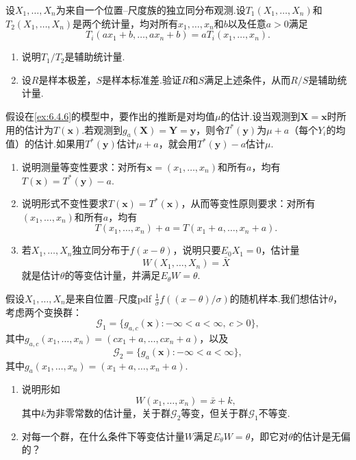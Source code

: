 \begin{exercise}\label{exercise:6.40}
设$X_1,\ldots,X_n$为来自一个位置--尺度族的独立同分布观测.设$T_1(X_1,\ldots,X_n)$和$T_2(X_1,\ldots,X_n)$是两个统计量，均对所有$x_1,\ldots,x_n$和$b$以及任意$a>0$满足
$$T_i(ax_1+b,\ldots,ax_n+b)=aT_i(x_1,\ldots,x_n).$$
\begin{enumerate}[label=(\alph*)]
\item 说明$T_1/T_2$是辅助统计量.
\item 设$R$是样本极差，$S$是样本标准差.验证$R$和$S$满足上述条件，从而$R/S$是辅助统计量.
\end{enumerate}
\end{exercise}
\begin{exercise}\label{exercise:6.41}
假设在\autoref{ex:6.4.6}的模型中，要作出的推断是对均值$\mu$的估计.设当观测到$\boldsymbol X=\boldsymbol x$时所用的估计为$T(\boldsymbol x)$.若观测到$g_a(\boldsymbol X)=\boldsymbol Y=\boldsymbol y$，则令$T^*(\boldsymbol y)$为$\mu+a$（每个$Y_i$的均值）的估计.如果用$T^*(\boldsymbol y)$估计$\mu+a$，就会用$T^*(\boldsymbol y)-a$估计$\mu$.
\begin{enumerate}[label=(\alph*)]
\item 说明测量等变性要求：对所有$\boldsymbol x=(x_1,\ldots,x_n)$和所有$a$，均有$T(\boldsymbol x)=T^*(\boldsymbol y)-a$.
\item 说明形式不变性要求$T(\boldsymbol x)=T^*(\boldsymbol x)$，从而等变性原则要求：对所有$(x_1,\ldots,x_n)$和所有$a$，均有
$$T(x_1,\ldots,x_n)+a=T(x_1+a,\ldots,x_n+a).$$
\item 若$X_1,\ldots,X_n$独立同分布于$f(x-\theta)$，说明只要$E_0X_1=0$，估计量
$$W(X_1,\ldots,X_n)=\bar X$$
就是估计$\theta$的等变估计量，并满足$E_\theta W=\theta$.
\end{enumerate}
\end{exercise}
\begin{exercise}\label{exercise:6.42}
假设$X_1,\ldots,X_n$是来自位置--尺度pdf $\frac1\sigma f((x-\theta)/\sigma)$的随机样本.我们想估计$\theta$，考虑两个变换群：
$$\mathcal G_1=\{g_{a,c}(\boldsymbol x):-\infty<a<\infty,\ c>0\},$$
其中$g_{a,c}(x_1,\ldots,x_n)=(cx_1+a,\ldots,cx_n+a)$，以及
$$\mathcal G_2=\{g_a(\boldsymbol x):-\infty<a<\infty\},$$
其中$g_a(x_1,\ldots,x_n)=(x_1+a,\ldots,x_n+a)$.
\begin{enumerate}[label=(\alph*)]
\item 说明形如
$$W(x_1,\ldots,x_n)=\bar x+k,$$
其中$k$为非零常数的估计量，关于群$\mathcal G_2$等变，但关于群$\mathcal G_1$不等变.
\item 对每一个群，在什么条件下等变估计量$W$满足$E_\theta W=\theta$，即它对$\theta$的估计是无偏的？
\end{enumerate}
\end{exercise}
